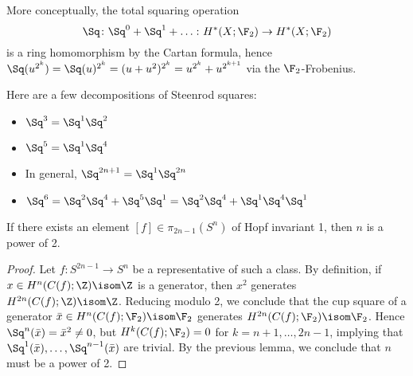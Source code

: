 \begin{remark}
	More conceptually, the total squaring operation
	\begin{equation*}
		\Sq \colon \Sq^0 + \Sq^1 + \ldots\colon H^*(X; \F_2) \to H^*(X; \F_2)
	\end{equation*}
	is a ring homomorphism by the Cartan formula, hence $\Sq(u^{2^k}) = \Sq(u)^{2^k} = (u + u^2)^{2^k} = u^{2^k} + u^{2^{k + 1}}$ via the $\F_2$-Frobenius.
\end{remark}
\begin{example}
	Here are a few decompositions of Steenrod squares:
	\begin{itemize}
		\item $\Sq^3 = \Sq^1 \Sq^2$
		\item $\Sq^5 = \Sq^1 \Sq^4$
		\item In general, $\Sq^{2n + 1} = \Sq^1 \Sq^{2n}$
		\item $\Sq^6 = \Sq^2 \Sq^4 + \Sq^5 \Sq^1 = \Sq^2 \Sq^4 + \Sq^1 \Sq^4 \Sq^1$
	\end{itemize}
\end{example}
\begin{corollary}
	If there exists an element $[f] \in \pi_{2n - 1}(S^n)$ of Hopf invariant 1, then $n$ is a power of 2.
\end{corollary}
\begin{proof}
	Let $f\colon S^{2n - 1} \to S^n$ be a representative of such a class.
	By definition, if $x \in H^n(C(f); \Z) \isom \Z$ is a generator, then $x^2$ generates $H^{2n}(C(f); \Z) \isom \Z$.
	Reducing modulo 2, we conclude that the cup square of a generator $\bar{x} \in H^n(C(f); \F_2) \isom \F_2$ generates $H^{2n}(C(f); \F_2) \isom \F_2$.
	Hence $\Sq^n(\bar{x}) = \bar{x}^2 \neq 0$, but $H^k(C(f); \F_2) = 0$ for $k = n + 1, \ldots, 2n - 1$, implying that $\Sq^1(\bar{x}), \ldots, \Sq^{n - 1}(\bar{x})$ are trivial.
	By the previous lemma, we conclude that $n$ must be a power of 2.
\end{proof}
